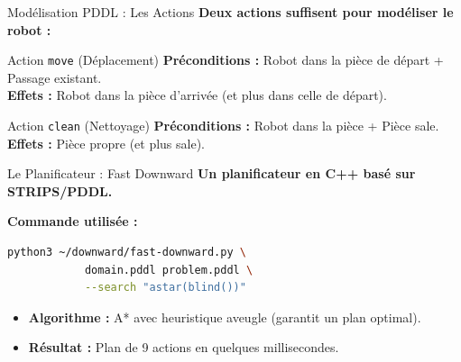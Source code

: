 \documentclass[10pt,aspectratio=169]{beamer}
\begin{document}
	\begin{frame}{Modélisation PDDL : Les Actions}
		\textbf{Deux actions suffisent pour modéliser le robot :}
		
		\vspace{0.3cm}
		\begin{block}{Action \texttt{move} (Déplacement)}
			\textbf{Préconditions :} Robot dans la pièce de départ + Passage existant. \\
			\textbf{Effets :} Robot dans la pièce d'arrivée (et plus dans celle de départ).
		\end{block}
		
		\begin{block}{Action \texttt{clean} (Nettoyage)}
			\textbf{Préconditions :} Robot dans la pièce + Pièce sale. \\
			\textbf{Effets :} Pièce propre (et plus sale).
		\end{block}
	\end{frame}
	
	\begin{frame}[fragile]{Le Planificateur : Fast Downward}
		\textbf{Un planificateur en C++ basé sur STRIPS/PDDL.}
		
		\vspace{0.5cm}
		\textbf{Commande utilisée :}
		\begin{lstlisting}[language=bash]
			python3 ~/downward/fast-downward.py \
			domain.pddl problem.pddl \
			--search "astar(blind())"
		\end{lstlisting}
		
		\vspace{0.3cm}
		\begin{itemize}
			\item \textbf{Algorithme :} A* avec heuristique aveugle (garantit un plan optimal).
			\item \textbf{Résultat :} Plan de 9 actions en quelques millisecondes.
		\end{itemize}
	\end{frame}
	
\end{document}
